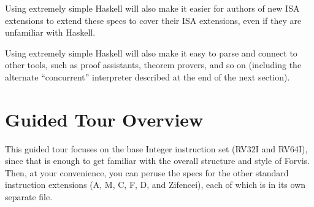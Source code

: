 \documentclass[11pt]{article}
\begin{document}
Using extremely simple Haskell will also make it easier for authors of
new ISA extensions to extend these specs to cover their ISA
extensions, even if they are unfamiliar with Haskell.

Using extremely simple Haskell will also make it easy to parse and
connect to other tools, such as proof assistants, theorem provers, and
so on (including the alternate ``concurrent'' interpreter described at
the end of the next section).


\section{Guided Tour Overview}

\label{sec_guided_tour_overview}

This guided tour focuses on the base Integer instruction set (RV32I
and RV64I), since that is enough to get familiar with the overall
structure and style of Forvis.  Then, at your convenience, you can
peruse the specs for the other standard instruction extensions (A, M,
C, F, D, and Zifencei), each of which is in its own separate file.
\end{document}
